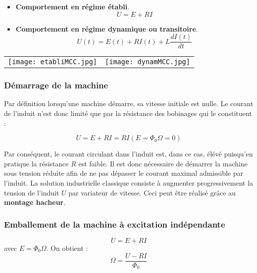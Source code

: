 \documentclass[12pt,prb,aps,epsf]{article}
\begin{document}
\begin{itemize}
    \item \textbf{Comportement en régime établi}. 
    \begin{equation}
        U = E + RI
    \end{equation}
    \item \textbf{Comportement en régime dynamique ou transitoire}. 
    \begin{equation}
        U(t) = E(t) + RI(t) + L \frac{dI (t)}{dt}
    \end{equation}
\end{itemize}


\begin{tabular}{cc}
   \texttt{[image: etabliMCC.jpg]} &
   \texttt{[image: dynamMCC.jpg]} \\
\end{tabular}



\subsubsection{Démarrage de la machine}

Par définition lorsqu'une machine démarre, sa vitesse initiale est nulle. Le courant de l'induit n'est donc limité que par la résistance des bobinages qui le constituent :

\begin{equation}
    U = E + RI = RI (E=\Phi_0\Omega=0)
\end{equation}

Par conséquent, le courant circulant dans l'induit est, dans ce cas, élévé puisqu'en pratique la résistance $R$ est faible. Il est donc nécessaire de démarrer la machine sous tension réduite afin de ne pas dépasser le courant maximal admissible par l'induit. La solution industrielle classique consiste à augmenter progressivement la tension de l'induit $U$ par variateur de vitesse. Ceci peut être réalisé grâce au \textbf{montage hacheur}.

\subsubsection{Emballement de la machine à excitation indépendante}

\begin{equation}
    U = E + RI
\end{equation}
avec $E=\Phi_0 \Omega$. On obtient :
\begin{equation}
    \Omega = \frac{U - RI}{\Phi_0}
\end{equation}
\end{document}
